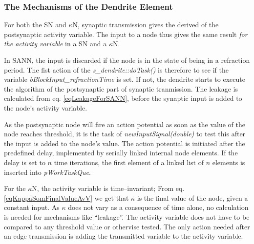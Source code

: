 
		\subsubsection{The Mechanisms of the Dendrite Element}
		For both the SN and $\kappa$N, synaptic transmission gives the derived of the postsynaptic activity variable.
		The input to a node thus gives the same result \emph{for the activity variable} in a SN and a $\kappa$N.
		
		In SANN, the input is discarded if the node is in the state of being in a refraction period.
		The fist action of the \emph{s\_dendrite::doTask()} is therefore to see if the variable \emph{bBlockInput\_refractionTime} is set.
		If not, the dendrite starts to execute the algorithm of the postsynaptic part of synaptic tranmission.
		The leakage is calculated from eq. \eqref{eqLeakageForSANN}, before the synaptic input is added to the node's activity variable.

		As the postsynaptic node will fire an action potential as soon as the value of the node reaches threshold, 
			it is the task of \emph{newInputSignal(double)} to test this after the input is added to the node's value.
		The action potential is initiated after the predefined delay, implemented by serially linked internal node elements.
		If the delay is set to $n$ time iterations, the first element of a linked list of $n$ elements is inserted into \emph{pWorkTaskQue}.

		For the $\kappa$N, the activity variable is time--invariant; From eq. \eqref{eqKappaSomFinalValueAvV} we get that $\kappa$ is the final value of the node, given a constant input.
		As $\kappa$ does not vary as a consequence of time alone, no calculation is needed for mechanisms like ``leakage''.
		The activity variable does not have to be compared to any threshold value or othervise tested.
		The only action needed after an edge transmission is adding the transmitted variable to the activity variable.

